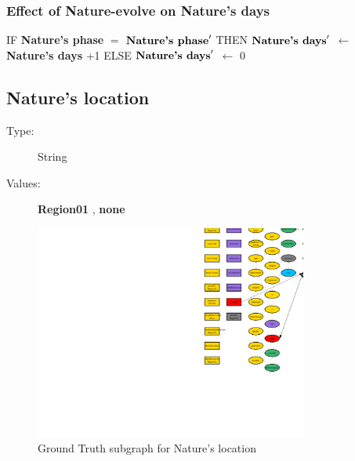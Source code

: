 \documentclass{article}%
\begin{document}
%
\subsubsection{Effect of Nature{-}evolve on Nature's days}%
\label{ssubsec:Effect of Nature{-}evolve on Nature's days}%
\begin{flushleft}%
IF %
\textbf{Nature's phase}%
$=$%
$\mbox{\textbf{Nature's phase}} '$%
\linebreak%
\hspace*{2em}%
THEN %
$\mbox{\textbf{Nature's days}} '$%
$\leftarrow$%
\textbf{Nature's days}%
+1%
\linebreak%
\hspace*{2em}%
ELSE %
$\mbox{\textbf{Nature's days}} '$%
$\leftarrow$%
0%
\end{flushleft}

%
\subsection{Nature's location}%
\label{subsec:Nature's location}%
\begin{description}%
\item[Type:]%
String%
\item[Values:]%
\textbf{Region01}%
, %
\textbf{none}%
\end{description}%


\begin{figure}[ht]%
\centering%
\includegraphics[width=0.8\textwidth]{images/locationOfNature.png}%
\caption{Ground Truth subgraph for Nature's location}%
\end{figure}

%
\end{document}
